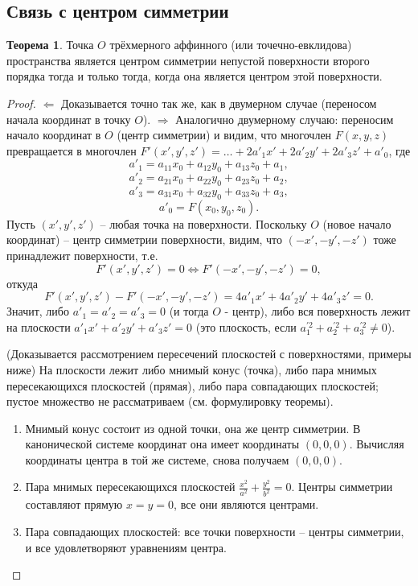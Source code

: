 \documentclass[a4paper, 12pt]{article}
\theoremstyle{definition}
\newtheorem*{theorem}{Теорема}
\begin{document}
\subsection{Связь с центром симметрии}
\begin{theorem}
    Точка $O$ трёхмерного аффинного (или точечно-евклидова) пространства является центром симметрии непустой поверхности второго порядка тогда и только тогда, когда она является центром этой поверхности.
\end{theorem}
\begin{proof}
    $\Leftarrow$ Доказывается точно так же, как в двумерном случае (переносом начала координат в точку $O$).
    $\Rightarrow$ Аналогично двумерному случаю: переносим начало координат в $O$ (центр симметрии) и видим, что многочлен $F(x,y,z)$ превращается в многочлен $F'(x', y', z') = \dots + 2a'_1 x' + 2a'_2 y' + 2a'_3 z' + a'_0$, где
    \[a'_1 = a_{11} x_0 + a_{12} y_0 + a_{13} z_0 + a_1,\]
    \[a'_2 = a_{21} x_0 + a_{22} y_0 + a_{23} z_0 + a_2,\]
    \[a'_3 = a_{31} x_0 + a_{32} y_0 + a_{33} z_0 + a_3,\]
    \[a'_0 = F(x_0, y_0, z_0).\]
    Пусть $(x', y', z')$ – любая точка на поверхности. Поскольку $O$ (новое начало координат) – центр симметрии поверхности, видим, что $(-x', -y', -z')$ тоже принадлежит поверхности, т.е.
    \[F'(x', y', z') = 0 \Leftrightarrow F'(-x', -y', -z') = 0,\]
    откуда
    \[F'(x', y', z') - F'(-x', -y', -z') = 4a'_1 x' + 4a'_2 y' + 4a'_3 z' = 0.\]
    Значит, либо $a'_1 = a'_2 = a'_3 = 0$ (и тогда $O$ - центр), либо вся поверхность лежит на плоскости $a'_1 x' + a'_2 y' + a'_3 z' = 0$ (это плоскость, если $a_1^{'2} + a_2^{'2} + a_3^{'2} \neq 0$).

    (Доказывается рассмотрением пересечений плоскостей с поверхностями, примеры ниже) На плоскости лежит либо мнимый конус (точка), либо пара мнимых пересекающихся плоскостей (прямая), либо пара совпадающих плоскостей; пустое множество не рассматриваем (см. формулировку теоремы).
    \begin{enumerate}
        \item Мнимый конус состоит из одной точки, она же центр симметрии. В канонической системе координат она имеет координаты $(0, 0, 0)$. Вычисляя координаты центра в той же системе, снова получаем $(0, 0, 0)$.
        \item Пара мнимых пересекающихся плоскостей $\frac{x^2}{a^2} + \frac{y^2}{b^2} = 0$. Центры симметрии составляют прямую $x = y = 0$, все они являются центрами.
        \item Пара совпадающих плоскостей: все точки поверхности – центры симметрии, и все удовлетворяют уравнениям центра.
    \end{enumerate}
\end{proof}
\end{document}
